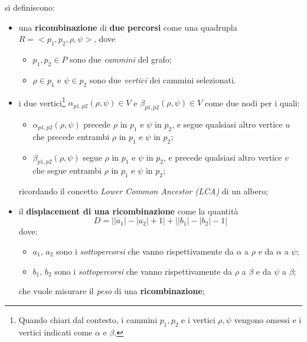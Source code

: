     si definiscono:
    \begin{itemize}
        \item una \textbf{ricombinazione} di \textbf{due percorsi} come una quadrupla $R = <p_1, p_2, \rho, \psi>$, dove 
            \begin{itemize}
                \item $p_1, p_2 \in P$ sono due \emph{cammini} del grafo;
                \item $\rho \in p_1$ e $\psi \in p_2$ sono due \emph{vertici} dei cammini selezionati.
            \end{itemize}

        \item i due vertici\footnote{Quando chiari dal contesto, i cammini $p_1, p_2$ e i vertici $\rho, \psi$ vengono omessi e i vertici indicati come $\alpha$ e $\beta$.} $\alpha_{p1, p2}(\rho, \psi) \in V$ e $\beta_{p1, p2}(\rho, \psi) \in V$ come due nodi per i quali:
        \begin{itemize}
            \item $\alpha_{p1, p2}(\rho, \psi)$ precede $\rho$ in $p_1$ e $\psi$ in $p_2$, e segue qualsiasi altro vertice $u$ che precede entrambi $\rho$ in $p_1$ e $\psi$ in $p_2$;
            \item $\beta_{p1, p2}(\rho, \psi)$ segue $\rho$ in $p_1$ e $\psi$ in $p_2$, e precede qualsiasi altro vertice $v$ che segue entrambi $\rho$ in $p_1$ e $\psi$ in $p_2$;
        \end{itemize}
        ricordando il concetto \emph{Lower Common Ancestor (LCA)} di un albero;

        \item il \textbf{displacement di una ricombinazione} come la quantità 
        \begin{equation}
            D = \lvert \lvert a_1 \rvert - \lvert a_2 \rvert + 1 \rvert + \lvert \lvert b_1 \rvert - \lvert b_2 \rvert - 1 \rvert 
            \label{equation:displacement}
        \end{equation}
        dove:
        \begin{itemize}
            \item $a_1, \, a_2$ sono i \emph{sottopercorsi} che vanno rispettivamente da $\alpha$ a $\rho$ e da $\alpha$ a $\psi$;
            \item $b_1, \, b_2$ sono i \emph{sottopercorsi} che vanno rispettivamente da $\rho$ a $\beta$ e da $\psi$ a $\beta$;
        \end{itemize}
        che vuole misurare il \emph{peso} di una \textbf{ricombinazione};


\end{itemize}
